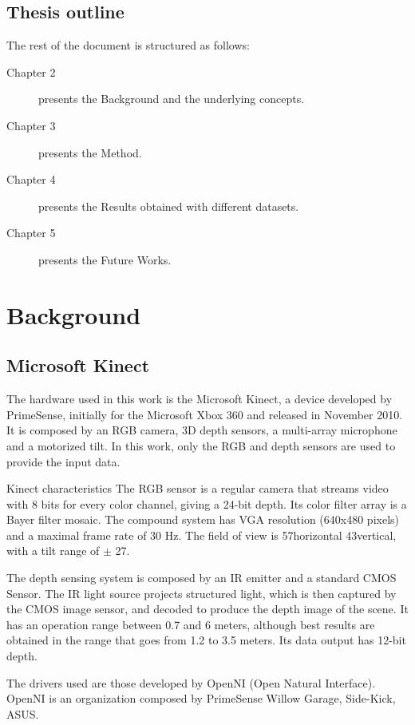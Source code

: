 \documentclass[a4paper,11pt]{kth-mag}
\begin{document}
\section{Thesis outline}
The rest of the document is structured as follows:
\begin{description}
\item[Chapter 2] presents the Background and the underlying concepts.
\item[Chapter 3] presents the Method.
\item[Chapter 4] presents the Results obtained with different datasets.
\item[Chapter 5] presents the Future Works.
\end{description}

\chapter{Background}

\section{Microsoft Kinect}

The hardware used in this work is the Microsoft Kinect, a device developed by PrimeSense, initially for the Microsoft Xbox 360 and released in November 2010. It is composed by an RGB camera, 3D depth sensors, a multi-array microphone and a motorized tilt. In this work, only the RGB and depth sensors are used to provide the input data.

Kinect characteristics
The RGB sensor is a regular camera that streams video with 8 bits for every color channel, giving a 24-bit depth. Its color filter array is a Bayer filter mosaic. The compound system has VGA resolution (640x480 pixels) and a maximal frame rate of 30 Hz. The field of view is 57\textdegree horizontal 43\textdegree vertical, with a tilt range of $\pm$ 27\textdegree.

The depth sensing system is composed by an IR emitter and a standard CMOS Sensor. The IR light source projects structured light, which is then captured by the CMOS image sensor, and decoded to produce the depth image of the scene. It has an operation range between 0.7 and 6 meters, although best results are obtained in the range that goes from 1.2 to 3.5 meters. Its data output has 12-bit depth.

The drivers used are those developed by OpenNI (Open Natural Interface). OpenNI is an organization composed by PrimeSense Willow Garage, Side-Kick, ASUS.
\end{document}
